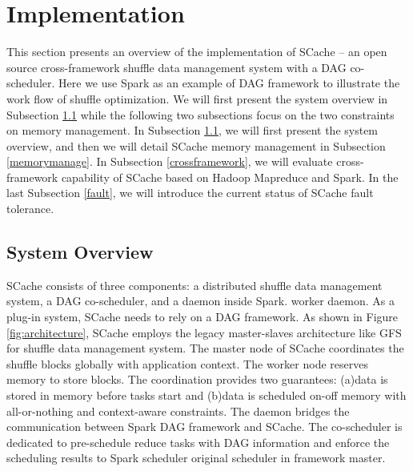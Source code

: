 \section{Implementation}\label{impl}
This section presents an overview of the implementation of SCache -- an open source cross-framework shuffle data management system with a DAG co-scheduler. 
{\color{red}
Here we use Spark as an example of DAG framework to illustrate the work flow of shuffle optimization. 
We will first present the system overview in Subsection \ref{arch} while the following two subsections focus on the two constraints on memory management.
}
{\color{blue}
In Subsection \ref{arch}, we will first present the system overview, and then we will detail SCache memory management in Subsection \ref{memorymanage}. In Subsection \ref{crossframework}, we will evaluate cross-framework capability of SCache based on Hadoop Mapreduce and Spark. 
In the last Subsection \ref{fault}, we will introduce the current status of SCache fault tolerance.
}


\subsection{System Overview}\label{arch}
SCache consists of three components: a distributed shuffle data management system, a DAG co-scheduler, and a {\color{red}daemon inside Spark.} {\color{blue} worker daemon. As a plug-in system, SCache needs to rely on a DAG framework.} As shown in Figure \ref{fig:architecture}, SCache employs the legacy master-slaves architecture like GFS \cite{gfs} for shuffle data management system. 
The master node of SCache coordinates the shuffle blocks globally with application context. The worker node reserves memory to store blocks.
The coordination provides two guarantees: (a)data is stored in memory before tasks start and (b)data is scheduled on-off memory with all-or-nothing and context-aware constraints. 
The daemon bridges the communication between {\color{red}Spark} {\color{blue} DAG framework} and SCache. The co-scheduler is dedicated to pre-schedule reduce tasks with DAG information and enforce the scheduling results to {\color{red}Spark scheduler} {\color{blue} original scheduler in framework master}.

